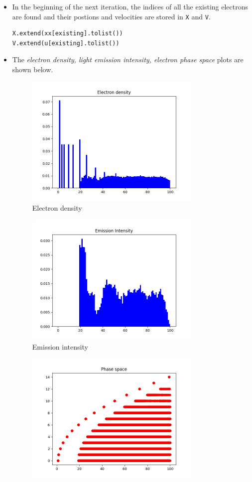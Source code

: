 \documentclass[12pt, a4paper]{article}
\begin{document}
\begin{itemize}
\item In the beginning of the next iteration, the indices of all the existing electrons are found and their postions and velocities are stored in \texttt{X} and \texttt{V}.
\begin{lstlisting}
X.extend(xx[existing].tolist())
V.extend(u[existing].tolist())
\end{lstlisting}
\item The \textit{electron density, light emission intensity, electron phase space} plots are shown below.
\begin{figure}[H]
\centering
\includegraphics[width=0.8\textwidth]{Figure_1.png}
\caption{Electron density}
\end{figure}
\begin{figure}[H]
\centering
\includegraphics[width=0.8\textwidth]{Figure_2.png}
\caption{Emission intensity}
\end{figure}
\begin{figure}[H]
\centering
\includegraphics[width=0.8\textwidth]{Figure_3.png}

\end{figure}
\end{itemize}
\end{document}
